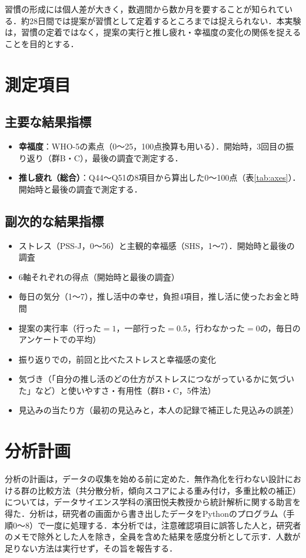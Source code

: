 習慣の形成には個人差が大きく，数週間から数か月を要することが知られている\cite{lally2010}．約28日間では提案が習慣として定着するところまでは捉えられない．本実験は，習慣の定着ではなく，提案の実行と推し疲れ・幸福度の変化の関係を捉えることを目的とする．

\section{測定項目}
\subsection{主要な結果指標}
\begin{itemize}
\item \textbf{幸福度}：WHO-5\cite{topp2015,inagaki2013}の素点（0〜25，100点換算も用いる）．開始時，3回目の振り返り（群B・C），最後の調査で測定する．
\item \textbf{推し疲れ（総合）}：Q44〜Q51の8項目から算出した0〜100点（表\ref{tab:axes}）．開始時と最後の調査で測定する．
\end{itemize}

\subsection{副次的な結果指標}
\begin{itemize}
\item ストレス（PSS-J\cite{mimura2008}，0〜56）と主観的幸福感（SHS\cite{shimai2004}，1〜7）．開始時と最後の調査
\item 6軸それぞれの得点（開始時と最後の調査）
\item 毎日の気分（1〜7），推し活中の幸せ，負担4項目，推し活に使ったお金と時間
\item 提案の実行率（行った$=1$，一部行った$=0.5$，行わなかった$=0$の，毎日のアンケートでの平均）
\item 振り返りでの，前回と比べたストレスと幸福感の変化
\item 気づき（「自分の推し活のどの仕方がストレスにつながっているかに気づいた」など）と使いやすさ・有用性（群B・C，5件法）
\item 見込みの当たり方（最初の見込みと，本人の記録で補正した見込みの誤差）
\end{itemize}

\section{分析計画}
分析の計画は，データの収集を始める前に定めた．無作為化を行わない設計における群の比較方法（共分散分析，傾向スコアによる重み付け，多重比較の補正）については，データサイエンス学科の濱田悦夫教授から統計解析に関する助言を得た．分析は，研究者の画面から書き出したデータをPythonのプログラム（手順0〜8）で一度に処理する．本分析では，注意確認項目に誤答した人と，研究者のメモで除外とした人を除き，全員を含めた結果を感度分析として示す．人数が足りない方法は実行せず，その旨を報告する．

